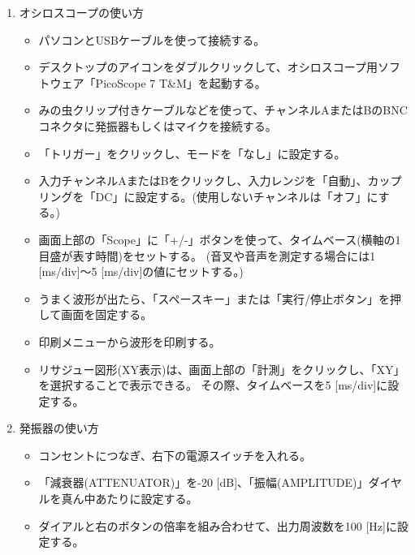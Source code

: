 \begin{enumerate}

\item オシロスコープの使い方

\begin{itemize}

\item パソコンとUSBケーブルを使って接続する。

\item デスクトップのアイコンをダブルクリックして、オシロスコープ用ソフトウェア「PicoScope 7 T\&M」を起動する。


\item みの虫クリップ付きケーブルなどを使って、チャンネルAまたはBのBNCコネクタに発振器もしくはマイクを接続する。

\item 「トリガー」をクリックし、モードを「なし」に設定する。


\item 入力チャンネルAまたはBをクリックし、入力レンジを「自動」、カップリングを「DC」に設定する。(使用しないチャンネルは「オフ」にする。)

\item 画面上部の「Scope」に「+/-」ボタンを使って、タイムベース(横軸の1目盛が表す時間)をセットする。
(音叉や音声を測定する場合には1 [ms/div]〜5 [ms/div]の値にセットする。)


\item うまく波形が出たら、「スペースキー」または「実行/停止ボタン」を押して画面を固定する。

\item 印刷メニューから波形を印刷する。

\item リサジュー図形(XY表示)は、画面上部の「計測」をクリックし、「XY」を選択することで表示できる。
その際、タイムベースを5 [ms/div]に設定する。

\end{itemize}

\item 発振器の使い方

\begin{itemize}

\item コンセントにつなぎ、右下の電源スイッチを入れる。

\item 「減衰器(ATTENUATOR)」を-20 [dB]、「振幅(AMPLITUDE)」ダイヤルを真ん中あたりに設定する。

\item ダイアルと右のボタンの倍率を組み合わせて、出力周波数を100 [Hz]に設定する。


\end{itemize}


\end{enumerate}


